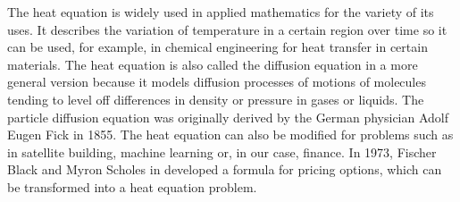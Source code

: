 \documentclass[00main.tex]{subfiles}
\begin{document}
The heat equation is widely used in applied mathematics for the variety of its uses. It describes the variation of temperature in a certain region over time so it can be used, for example, in chemical engineering for heat transfer in certain materials. The heat equation is also called the diffusion equation in a more general version because it models diffusion processes of motions of molecules tending to level off differences in density or pressure in gases or liquids. The particle diffusion equation was originally derived by the German physician Adolf Eugen Fick in 1855. The heat equation can also be modified for problems such as in satellite building, machine learning or, in our case, finance. In 1973, Fischer Black and Myron Scholes in \cite{b_s} developed a formula for pricing options, which can be transformed into a heat equation problem.



\end{document}
